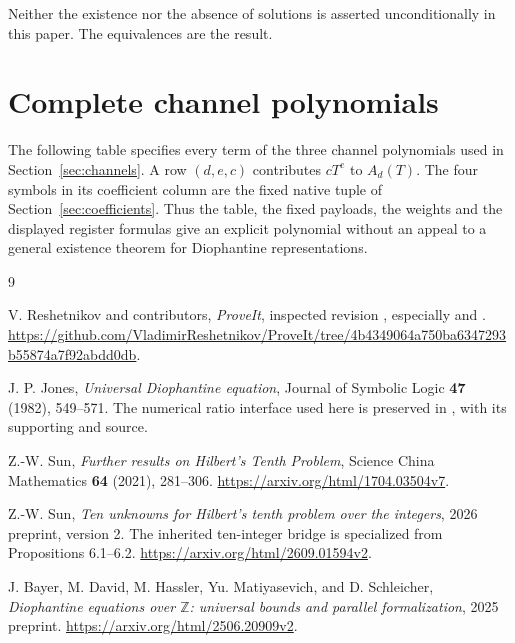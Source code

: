 \documentclass[11pt,a4paper]{article}
\newcommand{\Z}{\mathbb Z}
\theoremstyle{definition}
\begin{document}
Neither the existence nor the absence of solutions is asserted
unconditionally in this paper.  The equivalences are the result.

\appendix
\section{Complete channel polynomials}
\label{app:channels}

The following table specifies every term of the three channel polynomials
used in Section~\ref{sec:channels}.  A row \((d,e,c)\) contributes
\(cT^e\) to \(A_d(T)\).  The four symbols in its coefficient column
are the fixed native tuple of Section~\ref{sec:coefficients}.
Thus the table, the fixed payloads, the weights and the displayed register
formulas give an explicit polynomial without an appeal to a general
existence theorem for Diophantine representations.


\begin{thebibliography}{9}
\raggedright
{}
V. Reshetnikov and contributors, \emph{ProveIt}, inspected revision
, especially
and .
\url{https://github.com/VladimirReshetnikov/ProveIt/tree/4b4349064a750ba6347293b55874a7f92abdd0db}.

J. P. Jones, \emph{Universal Diophantine equation}, Journal of Symbolic
Logic \textbf{47} (1982), 549--571.  The numerical ratio interface used
here is preserved in , with its supporting
 and  source.

Z.-W. Sun, \emph{Further results on Hilbert's Tenth Problem},
Science China Mathematics \textbf{64} (2021), 281--306.
\url{https://arxiv.org/html/1704.03504v7}.

Z.-W. Sun, \emph{Ten unknowns for Hilbert's tenth problem over the integers},
2026 preprint, version 2.  The inherited ten-integer bridge is specialized
from Propositions 6.1--6.2.
\url{https://arxiv.org/html/2609.01594v2}.

J. Bayer, M. David, M. Hassler, Yu. Matiyasevich, and D. Schleicher,
\emph{Diophantine equations over \(\Z\): universal bounds and parallel
formalization}, 2025 preprint.
\url{https://arxiv.org/html/2506.20909v2}.
\end{thebibliography}
\end{document}
